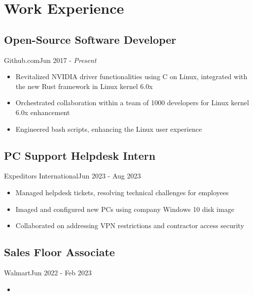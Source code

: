 \section{Work Experience}
\subsection{Open-Source Software Developer}{Github.com}{Jun 2017 - \textit{Present}}
\begin{itemize}
    \item Revitalized NVIDIA driver functionalities using C on Linux, integrated with the new Rust framework in Linux kernel 6.0x
    \item Orchestrated collaboration within a team of 1000 developers for Linux kernel 6.0x enhancement
    \item Engineered bash scripts, enhancing the Linux user experience
\end{itemize}
\subsection{PC Support Helpdesk Intern}{Expeditors International}{Jun 2023 - Aug 2023}
\begin{itemize}
    \item Managed helpdesk tickets, resolving technical challenges for employees
    \item Imaged and configured new PCs using company Windows 10 disk image
    \item Collaborated on addressing VPN restrictions and contractor access security
\end{itemize}
\subsection{Sales Floor Associate}{Walmart}{Jun 2022 - Feb 2023}
\begin{itemize}
    \item 
\end{itemize}
